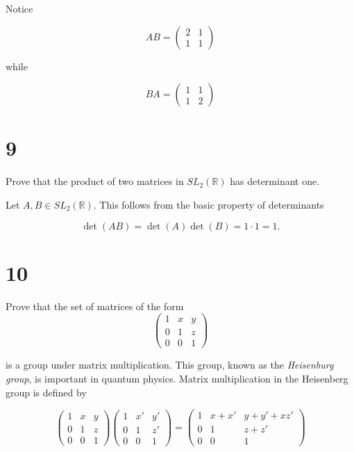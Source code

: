\documentclass[a4paper]{article}
\begin{document}
Notice

$$AB =   
  \begin{pmatrix}
    2 & 1 \\
    1 & 1
  \end{pmatrix}
$$

while 

$$BA = 
  \begin{pmatrix}
    1 & 1 \\
    1 & 2
  \end{pmatrix}
$$

\section*{9}

Prove that the product of two matrices in $SL_2(\mathbb{R})$ has determinant one.

\vspace{\baselineskip}

Let $A,B \in SL_2(\mathbb{R})$. This follows from the basic property of determinants

$$\det (AB) = \det(A) \det(B) = 1 \cdot 1 = 1.$$

\section*{10}

Prove that the set of matrices of the form
$$
  \begin{pmatrix}
    1 & x & y \\
    0 & 1 & z \\
    0 & 0 & 1
  \end{pmatrix}
$$

is a group under matrix multiplication. This group, known as the \textit{Heisenburg group}, is important in quantum physics. Matrix multiplication in the Heisenberg group is defined by

$$
  \begin{pmatrix}
    1 & x & y \\
    0 & 1 & z \\
    0 & 0 & 1
  \end{pmatrix}
  \begin{pmatrix}
    1 & x' & y' \\
    0 & 1 & z' \\
    0 & 0 & 1
  \end{pmatrix}
=
  \begin{pmatrix}
    1 & x + x' & y + y'+ xz' \\
    0 & 1 & z + z' \\
    0 & 0 & 1
  \end{pmatrix}
$$
\end{document}
